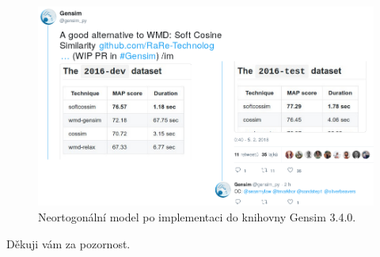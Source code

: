 \documentclass[aspectratio=169,t]{beamer}
\begin{document}
\begin{frame}[c]
\begin{figure}
\vfill
\begin{center}
\includegraphics[scale=0.45]{figs/gensim-twitter}
\end{center}
\caption{Neortogonální model po implementaci do knihovny Gensim 3.4.0.}
\end{figure}
\end{frame}


\begin{frame}[label=thanks, plain]
\vfill
\centerline{Děkuji vám za pozornost.}
\vfill
\end{frame}
\end{document}
